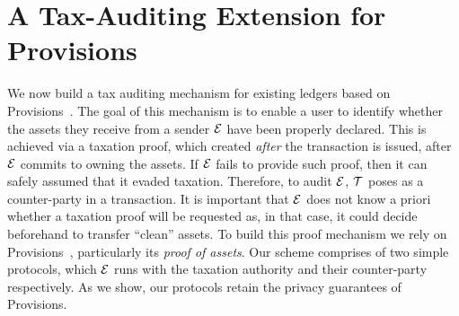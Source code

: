 \section{A Tax-Auditing Extension for Provisions}\label{sec:provisions-extension}

We now build a tax auditing mechanism for existing ledgers based on
Provisions~\cite{CCS:DBBCB15}. The goal of this mechanism is to enable a user
to identify whether the assets they receive from a sender $\mathcal{E}$ have been
properly declared. This is achieved via a taxation proof, which created
\emph{after} the transaction is issued, \ie after $\mathcal{E}$ commits to owning
the assets. If $\mathcal{E}$ fails to provide such proof, then it can safely
assumed that it evaded taxation. Therefore, to audit $\mathcal{E}$, $\mathcal{T}$
poses as a counter-party in a transaction.  It is important that $\mathcal{E}$
does not know a priori whether a taxation proof will be requested as, in that
case, it could decide beforehand to transfer ``clean'' assets.
To build this proof mechanism we rely on Provisions~\cite{CCS:DBBCB15},
particularly its \emph{proof of assets}. Our scheme comprises of two simple
protocols, which $\mathcal{E}$ runs with the taxation authority and their
counter-party respectively. As we show, our protocols retain the privacy
guarantees of Provisions.


